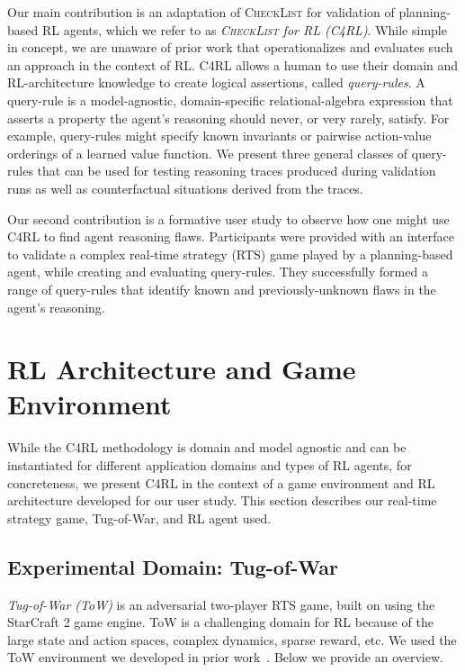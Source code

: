 \documentclass[letterpaper]{article} %
\begin{document}
Our main contribution is an adaptation of \textsc{CheckList} for validation of planning-based RL agents, which we refer to as \emph{\textsc{CheckList} for RL (C4RL)}. While simple in concept, we are unaware of prior work that operationalizes and evaluates such an approach in the context of RL. C4RL allows a human to use their domain and RL-architecture knowledge to create logical assertions, called \emph{query-rules}. A query-rule is a model-agnostic, domain-specific relational-algebra expression that asserts a property the agent's reasoning should never, or very rarely, satisfy. For example, query-rules might specify known invariants or pairwise action-value orderings of a learned value function. We present three general classes of query-rules that can be used for testing reasoning traces produced during validation runs as well as counterfactual situations derived from the traces.

Our second contribution is a formative user study to observe how one might use C4RL to find agent reasoning flaws. 
Participants were provided with an interface to validate a complex real-time strategy (RTS) game played by a planning-based agent, while creating and evaluating query-rules. 
They successfully formed a range of query-rules that identify known and previously-unknown flaws in the agent's reasoning.

\section{RL Architecture and Game Environment}

While the C4RL methodology is domain and model agnostic and can be instantiated for different application domains and types of RL agents, for concreteness, we present C4RL in the context of a game environment and RL architecture developed for our user study.
This section describes our real-time strategy game, Tug-of-War, and RL agent used. 

\subsection{Experimental Domain: Tug-of-War}
\label{gameRules-information}

\emph{Tug-of-War (ToW)} is an adversarial two-player RTS game, built on using the StarCraft 2 game engine. ToW is a challenging domain for RL because of the large state and action spaces, complex dynamics, sparse reward, etc. 
We used the ToW environment we developed in prior work~\cite{lam2021identifying}. Below we provide an overview.
\end{document}
